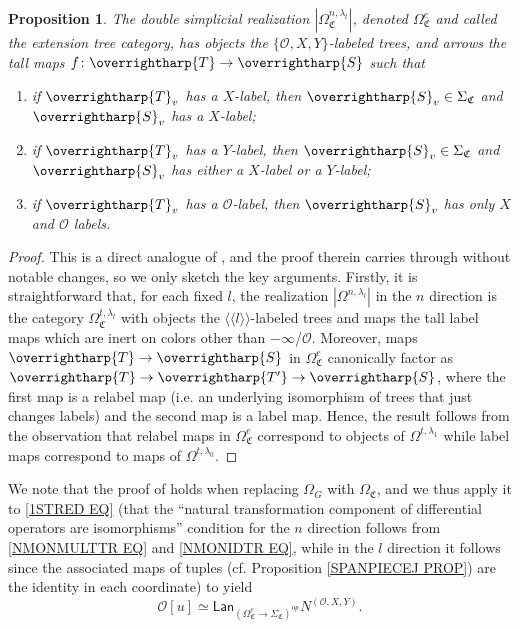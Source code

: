 \documentclass[a4paper,10pt
]{article}%
\numberwithin{equation}{section}
\numberwithin{figure}{section}
\newtheorem{proposition}[equation]{Proposition}%
\theoremstyle{definition} %
\newcommand{\vect}[1]{\text{\overrightharp{\ensuremath{#1}}}}
\renewcommand{\O}{\ensuremath{\mathcal O}}
\newcommand{\1}{\ensuremath{\mathbbm 1}}%
\newcommand{\OC}{\Omega_{\mathfrak C}}
\begin{document}
\begin{proposition}\label{EXTENTREE PROP}
	The double simplicial realization
	$|\Omega_{\mathfrak C}^{n,\lambda_l}|$,
	denoted $\OC^e$
	and called the \emph{extension tree category},
	has objects the 
	$\{\O,X,Y\}$-labeled trees,
	and arrows the tall maps $f \colon \vect{T} \to \vect{S}$ such that
	\begin{enumerate}[label=(\roman*)]
		\item if $\vect{T}_v$ has a $X$-label, 
		then $\vect{S}_v \in \Sigma_{\mathfrak{C}}$ and
		$\vect{S}_v $ has a $X$-label;
		\item if $\vect{T}_v$ has a $Y$-label, then 
		$\vect{S}_v \in \Sigma_{\mathfrak{C}}$ and
		$\vect{S}_v $ has either a $X$-label or a $Y$-label;
		\item if $\vect{T}_v$ has a $\O$-label, then 
		$\vect{S}_v $ has only $X$ and $\O$ labels.
	\end{enumerate}
\end{proposition}


\begin{proof}
	This is a direct analogue of \cite[Prop. 5.47]{BP21}, and the proof therein carries through without notable changes, so we only sketch the key arguments.
	Firstly, it is straightforward \cite[Rem. 5.41]{BP21} that, for each fixed $l$,
	the realization $|\Omega^{n,\lambda_l}|$
	in the $n$ direction is the category 
	$\Omega^{t,\lambda_l}_{\mathfrak{C}}$
	with objects the $\langle \langle l \rangle \rangle$-labeled trees and  maps the tall label maps which are inert on colors other than $-\infty$/$\O$.
	Moreover, maps 
	$\vect{T} \to \vect{S}$
	in 
	$\Omega^e_{\mathfrak{C}}$
	canonically factor as
	$\vect{T} \to \vect{T'} \to \vect{S}$,
	where the first map is a relabel map (i.e. an underlying isomorphism of trees that just changes labels) and the second map is a label map. 
	Hence, the result follows from the observation that relabel maps in 
	$\Omega^e_{\mathfrak{C}}$
	correspond to objects of  
	$\Omega^{t,\lambda_1}$
	while label maps correspond to maps of
	$\Omega^{t,\lambda_0}$.
\end{proof}



We note that the proof of \cite[Prop. 5.42]{BP21} %
holds when replacing $\Omega_G$ with $\Omega_{\mathfrak C}$,
and we thus 
apply it to
\eqref{1STRED EQ}
(that the ``natural transformation component of differential operators are isomorphisms'' condition for the $n$ direction follows from \eqref{NMONMULTTR EQ} and \eqref{NMONIDTR EQ},
while in the $l$ direction it follows since the associated maps of tuples (cf. Proposition \ref{SPANPIECEJ PROP}) are the identity in each coordinate)
to yield
\begin{equation}\label{2NDRED EQ}
\O[u] \simeq
\mathsf{Lan}_{\left(\Omega_{\mathfrak C}^{e} \to
	\Sigma_{\mathfrak C}\right)^{op}} N^{(\O,X,Y)}.
\end{equation}
\end{document}

